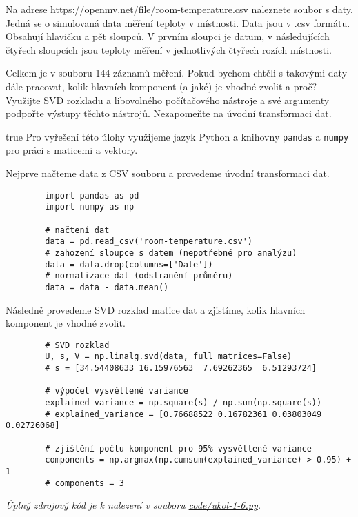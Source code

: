 \documentclass[10pt, a4paper]{ReportSheet}
\begin{document}
    \begin{uloha}{6}{3}{
        Na adrese \url{https://openmv.net/file/room-temperature.csv} naleznete soubor s daty. Jedná se o simulovaná data měření teploty v místnosti. Data jsou v .csv formátu. Obsahují hlavičku a pět sloupců. V prvním sloupci je datum, v následujících čtyřech sloupcích jsou teploty měření v jednotlivých čtyřech rozích místnosti.

        Celkem je v souboru 144 záznamů měření. Pokud bychom chtěli s takovými daty dále pracovat, kolik hlavních komponent (a jaké) je vhodné zvolit a proč?
        Využijte SVD rozkladu a libovolného počítačového nástroje a své argumenty podpořte výstupy těchto nástrojů. Nezapomeňte na úvodní transformaci dat.
    }{true}
        Pro vyřešení této úlohy využijeme jazyk Python a knihovny \texttt{pandas} a \texttt{numpy} pro práci s maticemi a vektory.

        Nejprve načteme data z CSV souboru a provedeme úvodní transformaci dat.
        \begin{verbatim}
        import pandas as pd
        import numpy as np

        # načtení dat
        data = pd.read_csv('room-temperature.csv')
        # zahození sloupce s datem (nepotřebné pro analýzu)
        data = data.drop(columns=['Date'])
        # normalizace dat (odstranění průměru)
        data = data - data.mean()
        \end{verbatim}

        Následně provedeme SVD rozklad matice dat a zjistíme, kolik hlavních komponent je vhodné zvolit.
        \begin{verbatim}
        # SVD rozklad
        U, s, V = np.linalg.svd(data, full_matrices=False)
        # s = [34.54408633 16.15976563  7.69262365  6.51293724]

        # výpočet vysvětlené variance
        explained_variance = np.square(s) / np.sum(np.square(s))
        # explained_variance = [0.76688522 0.16782361 0.03803049 0.02726068]

        # zjištění počtu komponent pro 95% vysvětlené variance
        components = np.argmax(np.cumsum(explained_variance) > 0.95) + 1
        # components = 3
        \end{verbatim}


        \textit{
            Úplný zdrojový kód je k nalezení v souboru \href{https://github.com/filipditrich/MMAD-2024/blob/main/code/ukol-1-6.py}{code/ukol-1-6.py}.
        }
    \end{uloha}
\end{document}
